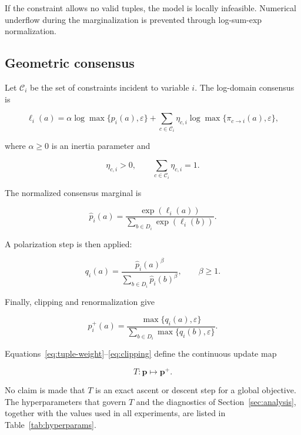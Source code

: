 \documentclass[pdflatex,sn-mathphys-num,iicol,oneside]{sn-jnl}
\begin{document}
If the constraint allows no valid tuples, the model is locally
infeasible. Numerical underflow during the marginalization is
prevented through log-sum-exp normalization.

\subsection{Geometric consensus}

Let $\mathcal{C}_i$ be the set of constraints incident to variable
$i$. The log-domain consensus is

\begin{equation}
\ell_i(a)
=
\alpha\log\max\{p_i(a),\varepsilon\}
+
\sum_{c\in\mathcal{C}_i}
\eta_{c,i}
\log\max\{\pi_{c\rightarrow i}(a),\varepsilon\},
\label{eq:consensus}
\end{equation}

where $\alpha\geq 0$ is an inertia parameter and

\begin{equation}
\eta_{c,i}>0,
\qquad
\sum_{c\in\mathcal{C}_i}\eta_{c,i}=1.
\end{equation}

The normalized consensus marginal is

\begin{equation}
\widehat{p}_i(a)
=
\frac{\exp(\ell_i(a))}
{\sum_{b\in D_i}\exp(\ell_i(b))}.
\end{equation}

A polarization step is then applied:

\begin{equation}
q_i(a)
=
\frac{\widehat{p}_i(a)^{\beta}}
{\sum_{b\in D_i}\widehat{p}_i(b)^{\beta}},
\qquad \beta\geq 1.
\label{eq:polarization}
\end{equation}

Finally, clipping and renormalization give

\begin{equation}
p_i^{+}(a)
=
\frac{\max\{q_i(a),\varepsilon\}}
{\sum_{b\in D_i}\max\{q_i(b),\varepsilon\}}.
\label{eq:clipping}
\end{equation}

Equations~\eqref{eq:tuple-weight}--\eqref{eq:clipping} define the
continuous update map

\begin{equation}
T:\bm{p}\mapsto\bm{p}^{+}.
\end{equation}

No claim is made that $T$ is an exact ascent or descent step for a
global objective. The hyperparameters that govern $T$ and the
diagnostics of Section~\ref{sec:analysis}, together with the values
used in all experiments, are listed in Table~\ref{tab:hyperparams}.
\end{document}
